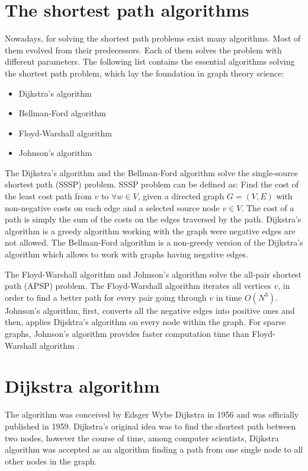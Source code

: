 \documentclass[thesis=M,english]{FITthesis}[2012/10/20]
\begin{document}
\section{The shortest path algorithms}
Nowadays, for solving the shortest path problems exist many algorithms. Most of them evolved from their predecessors. Each of them solves the problem with different parameters. 
The following list contains the essential algorithms solving the shortest path problem, which lay the foundation in graph theory science:
\begin{itemize}
\item Dijkstra's algorithm
\item Bellman-Ford algorithm
\item Floyd-Warshall algorithm
\item Johnson's algorithm 
\end{itemize}

The Dijkstra's algorithm \cite{Dijkstra59} and the Bellman-Ford algorithm \cite{Bellman58, FordFulkerson62} solve the single-source shortest path (SSSP) problem. SSSP problem can be defined as: Find the cost of the least cost path from $v$ to $\forall w \in V$, given a directed graph $G = (V,E)$ with non-negative costs on each edge and a selected source node $v \in V$. The cost of a path is simply the sum of the costs on the edges traversed by the path. Dijkstra's algorithm is a greedy algorithm working with the graph were negative edges are not allowed. The Bellman-Ford algorithm is a non-greedy version of the Dijkstra's algorithm which allows to work with graphs having negative edges.

The Floyd-Warshall algorithm \cite{Warshall62, Floyd56} and Johnson's algorithm \cite{Johnson77} solve the all-pair shortest path (APSP) problem. The Floyd-Warshall algorithm iterates all vertices $v$, in order to find a better path for every pair going through $v$ in time $O(N^3)$. Johnson's algorithm, first, converts all the negative edges into positive ones and then, applies Dijsktra's algorithm on every node within the graph. 
For sparse graphs, Johnson's algorithm provides faster computation time than Floyd-Warshall algorithm \cite{Cormen01}.


\section{Dijkstra algorithm}
\label{sec:dijsktra}
The algorithm was conceived by Edsger Wybe Dijkstra in 1956 and was officially published in 1959. Dijkstra's original idea was to find the shortest path between two nodes, however the course of time, among computer scientists, Dijkstra algorithm was accepted as an algorithm finding a path from one single node to all other nodes in the graph. 
\end{document}
